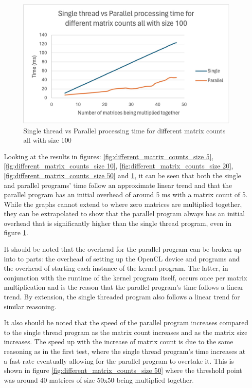 \begin{figure}[H]
    \centering
    \includegraphics[width=1\columnwidth]{Figures/different_matrix_counts_size_100}
    \caption{Single thread vs Parallel processing time for different matrix counts all with size 100}
    \label{fig:different_matrix_counts_size 100}
\end{figure}

Looking at the results in figures: \ref{fig:different_matrix_counts_size 5}, \ref{fig:different_matrix_counts_size 10}, \ref{fig:different_matrix_counts_size 20}, \ref{fig:different_matrix_counts_size 50} and \ref{fig:different_matrix_counts_size 100},
it can be seen that both the single and parallel programs' time follow an approximate linear trend and that the parallel program has an initial overhead of around 5 ms with a matrix count of 5.
While the graphs cannot extend to where zero matrices are multiplied together, they can be extrapolated to show that the parallel program always has an initial overhead that is significantly higher than the single thread program, even in figure \ref{fig:different_matrix_counts_size 100}.


It should be noted that the overhead for the parallel program can be broken up into to parts: the overhead of setting up the OpenCL device and programs and the overhead of starting each instance of the kernel program.
The latter, in conjunction with the runtime of the kernel program itself, occurs once per matrix multiplication and is the reason that the parallel program's time follows a linear trend.
By extension, the single threaded program also follows a linear trend for similar reasoning.


It also should be noted that the speed of the parallel program increases compared to the single thread program as the matrix count increases and as the matrix size increases.
The speed up with the increase of matrix count is due to the same reasoning as in the first test, where the single thread program's time increases at a fast rate eventually allowing for the parallel program to overtake it.
This is shown in figure \ref{fig:different_matrix_counts_size 50} where the threshold point was around 40 matrices of size 50x50 being multiplied together.


